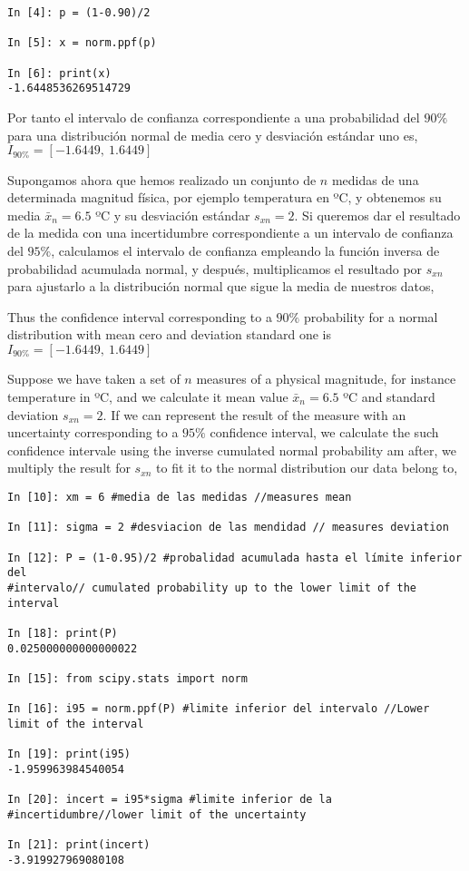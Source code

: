 \begin{center}
\begin{minipage}{0.5\textwidth}
	\begin{verbatim}
In [4]: p = (1-0.90)/2

In [5]: x = norm.ppf(p)

In [6]: print(x)
-1.6448536269514729
\end{verbatim}
\end{minipage}
\end{center}
\begin{paracol}{2}
Por tanto el intervalo de confianza correspondiente a una probabilidad del $90\%$ para una distribución normal de media cero y desviación estándar uno es, \\$I_{90\%} =[-1.6449,\ 1.6449]$

Supongamos ahora que hemos realizado un conjunto de $n$ medidas de una determinada magnitud física, por ejemplo temperatura en ºC, y obtenemos su media $\bar{x}_n=6.5$ ºC y su desviación estándar $s_{xn}=2$. Si queremos dar el resultado de la medida con una incertidumbre correspondiente a un intervalo de confianza del $95\%$, calculamos el intervalo de confianza empleando la función inversa de probabilidad acumulada normal, y después, multiplicamos el resultado por $s_{xn}$ para ajustarlo a la distribución normal que sigue la media de nuestros datos, 

\switchcolumn
Thus the confidence interval corresponding to a $90\%$ probability for a normal distribution with mean cero and deviation standard one is $I_{90\%} =[-1.6449,\ 1.6449]$

Suppose we have taken a set of $n$ measures of a physical magnitude, for instance temperature in ºC, and we calculate it mean value $\bar{x}_n=6.5$ ºC and standard deviation $s_{xn}=2$. If we can represent the result of the measure with an uncertainty corresponding to a $95\%$ confidence interval, we calculate the such confidence intervale using the inverse cumulated normal probability am after, we multiply the result for $s_{xn}$ to fit it to the normal distribution our data belong to,   
\end{paracol}

\begin{verbatim}
In [10]: xm = 6 #media de las medidas //measures mean
			
In [11]: sigma = 2 #desviacion de las mendidad // measures deviation
			
In [12]: P = (1-0.95)/2 #probalidad acumulada hasta el límite inferior del 
#intervalo// cumulated probability up to the lower limit of the interval
			
In [18]: print(P)
0.025000000000000022
			
In [15]: from scipy.stats import norm
			
In [16]: i95 = norm.ppf(P) #limite inferior del intervalo //Lower limit of the interval
			
In [19]: print(i95)
-1.959963984540054
			
In [20]: incert = i95*sigma #limite inferior de la 
#incertidumbre//lower limit of the uncertainty 
			
In [21]: print(incert)
-3.919927969080108
\end{verbatim}

